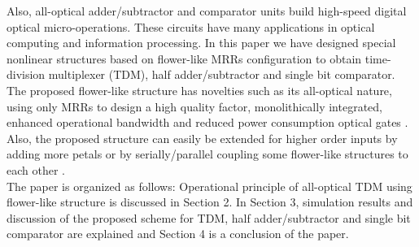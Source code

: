 \documentclass{osa-article}
\begin{document}
 Also, all-optical adder/subtractor and comparator units build high-speed digital optical micro-operations. These circuits have many applications in optical computing and information processing. In this paper we have designed special nonlinear structures based on flower-like MRRs configuration \cite{razaghi2016design} to obtain time-division multiplexer (TDM), half adder/subtractor and single bit comparator. The proposed flower-like structure has novelties such as its all-optical nature, using only MRRs to design a high quality factor, monolithically integrated, enhanced operational bandwidth and reduced power consumption optical gates \cite{laleh2019performance}. Also, the proposed structure can easily be extended for higher order inputs by adding more petals or by serially/parallel coupling some flower-like structures to each other \cite{razaghi2016design}.\\
The paper is organized as follows: Operational principle of all-optical TDM using flower-like structure is discussed in Section 2. In Section 3, simulation results and discussion of the proposed scheme for TDM, half adder/subtractor and single bit comparator are explained and Section 4 is a conclusion of the paper.
\end{document}
